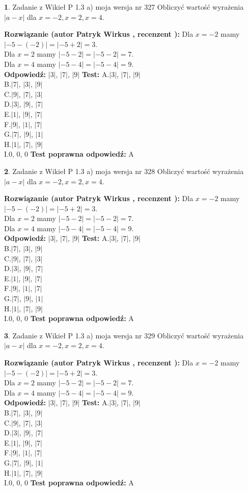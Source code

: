 \documentclass[12pt, a4paper]{article}
\theoremstyle{definition} %
\newtheorem{zad}{}
\newcommand{\zadStart}[1]{\begin{zad}#1\newline}
\newcommand{\zadStop}{\end{zad}}
\newcommand{\rozwStart}[2]{\noindent \textbf{Rozwiązanie (autor #1 , recenzent #2): }\newline}
\newcommand{\rozwStop}{\newline}
\newcommand{\odpStart}{\noindent \textbf{Odpowiedź:}\newline}
\newcommand{\odpStop}{\newline}
\newcommand{\testStart}{\noindent \textbf{Test:}\newline}
\newcommand{\testStop}{\newline}
\newcommand{\kluczStart}{\noindent \textbf{Test poprawna odpowiedź:}\newline}
\newcommand{\kluczStop}{\newline}
\begin{document}
\zadStart{Zadanie z Wikieł P 1.3 a) moja wersja nr 327}
Obliczyć wartość wyrażenia $|a - x|$ dla $x=-2,x=2,x=4$.
\zadStop
\rozwStart{Patryk Wirkus}{}
Dla $x = -2$ mamy $|-5 - (-2)| = |-5 + 2| = 3$.\\
Dla $x = 2$ mamy $|-5 - 2| = |-5 - 2| = 7$.\\
Dla $x = 4$ mamy $|-5 - 4| = |-5 - 4| = 9$.\\
\rozwStop
\odpStart
$|3|$, $|7|$, $|9|$
\odpStop
\testStart
A.$|3|$, $|7|$, $|9|$\\
B.$|7|$, $|3|$, $|9|$\\
C.$|9|$, $|7|$, $|3|$\\
D.$|3|$, $|9|$, $|7|$\\
E.$|1|$, $|9|$, $|7|$\\
F.$|9|$, $|1|$, $|7|$\\
G.$|7|$, $|9|$, $|1|$\\
H.$|1|$, $|7|$, $|9|$\\
I.$0$, $0$, $0$
\testStop
\kluczStart
A
\kluczStop



\zadStart{Zadanie z Wikieł P 1.3 a) moja wersja nr 328}
Obliczyć wartość wyrażenia $|a - x|$ dla $x=-2,x=2,x=4$.
\zadStop
\rozwStart{Patryk Wirkus}{}
Dla $x = -2$ mamy $|-5 - (-2)| = |-5 + 2| = 3$.\\
Dla $x = 2$ mamy $|-5 - 2| = |-5 - 2| = 7$.\\
Dla $x = 4$ mamy $|-5 - 4| = |-5 - 4| = 9$.\\
\rozwStop
\odpStart
$|3|$, $|7|$, $|9|$
\odpStop
\testStart
A.$|3|$, $|7|$, $|9|$\\
B.$|7|$, $|3|$, $|9|$\\
C.$|9|$, $|7|$, $|3|$\\
D.$|3|$, $|9|$, $|7|$\\
E.$|1|$, $|9|$, $|7|$\\
F.$|9|$, $|1|$, $|7|$\\
G.$|7|$, $|9|$, $|1|$\\
H.$|1|$, $|7|$, $|9|$\\
I.$0$, $0$, $0$
\testStop
\kluczStart
A
\kluczStop



\zadStart{Zadanie z Wikieł P 1.3 a) moja wersja nr 329}
Obliczyć wartość wyrażenia $|a - x|$ dla $x=-2,x=2,x=4$.
\zadStop
\rozwStart{Patryk Wirkus}{}
Dla $x = -2$ mamy $|-5 - (-2)| = |-5 + 2| = 3$.\\
Dla $x = 2$ mamy $|-5 - 2| = |-5 - 2| = 7$.\\
Dla $x = 4$ mamy $|-5 - 4| = |-5 - 4| = 9$.\\
\rozwStop
\odpStart
$|3|$, $|7|$, $|9|$
\odpStop
\testStart
A.$|3|$, $|7|$, $|9|$\\
B.$|7|$, $|3|$, $|9|$\\
C.$|9|$, $|7|$, $|3|$\\
D.$|3|$, $|9|$, $|7|$\\
E.$|1|$, $|9|$, $|7|$\\
F.$|9|$, $|1|$, $|7|$\\
G.$|7|$, $|9|$, $|1|$\\
H.$|1|$, $|7|$, $|9|$\\
I.$0$, $0$, $0$
\testStop
\kluczStart
A
\kluczStop
\end{document}
